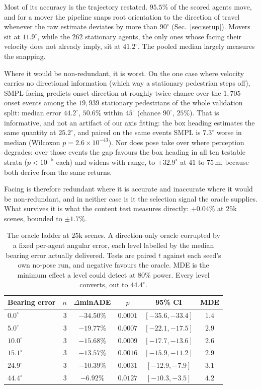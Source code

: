 \documentclass[conference]{IEEEtran}
\newcommand{\minADE}{minADE\xspace}
\begin{document}
Most of its accuracy is the trajectory restated. $95.5\%$ of the scored
agents move, and for a mover the pipeline snaps root orientation to the direction
of travel whenever the raw estimate deviates by more than $90^\circ$
(Sec.~\ref{sec:setup}). Movers sit at $11.9^\circ$, while the $262$ stationary
agents, the only ones whose facing their velocity does not already imply, sit
at $41.2^\circ$. The pooled median largely measures the snapping.

Where it would be non-redundant, it is worst. On the one case where
velocity carries no directional information (which way a stationary pedestrian
steps off), SMPL facing predicts onset direction at roughly twice chance over
the $1{,}705$ onset events among the $19{,}939$ stationary pedestrians of the whole validation split: median error $44.2^\circ$, $50.6\%$ within
$45^\circ$ (chance $90^\circ$, $25\%$). That is informative, and not an
artifact of our axis fitting: the box heading
estimates the same quantity at $25.2^\circ$, and paired on the same events SMPL
is $7.3^\circ$ worse in median (Wilcoxon $p{=}2.6{\times}10^{-43}$). Nor does
pose take over where perception degrades: over those events the gap
favours the box heading in all ten testable strata ($p<10^{-5}$ each) and
widens with range, to $+32.9^\circ$ at $41$ to $75$\,m, because both derive
from the same returns.

Facing is therefore redundant where it is accurate and inaccurate where it would
be non-redundant, and in neither case is it the selection signal the
oracle supplies. What survives it is what the content test measures directly:
$+0.04\%$ at $25$k scenes, bounded to $\pm1.7\%$.

\begin{table}[t]
\caption{The oracle ladder at $25$k scenes. A direction-only oracle corrupted by a fixed
per-agent angular error, each level labelled by the median bearing error actually
delivered. Tests are paired $t$ against each seed's own no-pose run, and
negative favours the oracle. MDE is the minimum effect a level could detect at
$80\%$ power. Every level converts, out to $44.4^\circ$.}
\label{tab:floor}
\centering
\footnotesize
\setlength{\tabcolsep}{3.5pt}
\begin{tabular}{@{}lrcccc@{}}
\toprule
Bearing error & $n$ & $\Delta$\minADE & $p$ & 95\% CI & MDE \\
\midrule
$0.0^\circ$  & 3 & $-34.50\%$ & $0.0001$ & $[-35.6,-33.4]$ & $1.4$ \\
$5.0^\circ$  & 3 & $-19.77\%$ & $0.0007$ & $[-22.1,-17.5]$ & $2.9$ \\
$10.0^\circ$ & 3 & $-15.68\%$ & $0.0009$ & $[-17.7,-13.6]$ & $2.6$ \\
$15.1^\circ$ & 3 & $-13.57\%$ & $0.0016$ & $[-15.9,-11.2]$ & $2.9$ \\
$24.9^\circ$ & 3 & $-10.39\%$ & $0.0031$ & $[-12.9,-7.9]$ & $3.1$ \\
$44.4^\circ$ & 3 & $-6.92\%$ & $0.0127$ & $[-10.3,-3.5]$ & $4.2$ \\
\bottomrule
\end{tabular}
\end{table}
\end{document}
